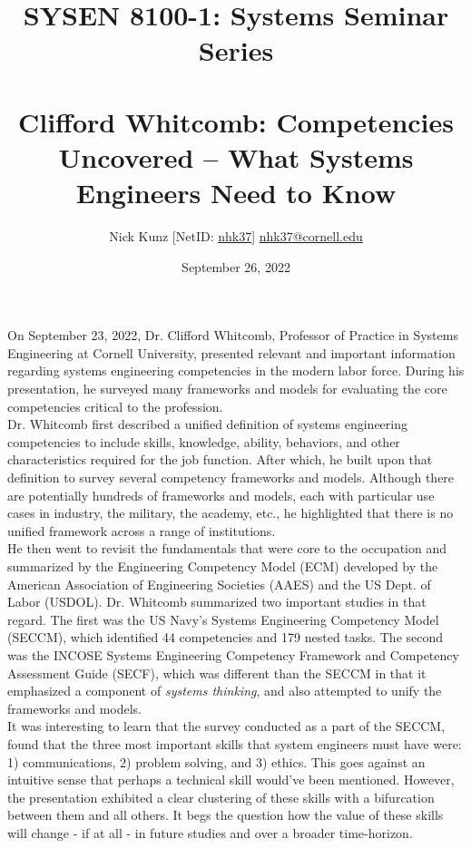 \documentclass[11pt]{article}
\begin{document}
\title{SYSEN 8100-1: Systems Seminar Series\\~\\
    \Large Clifford Whitcomb: Competencies Uncovered – What Systems Engineers Need to Know
}
\author{
    Nick Kunz [NetID: \url{nhk37}] \hyperlink{nhk37@cornell.edu}{nhk37@cornell.edu}
}
\date{September 26, 2022}
\maketitle

On September 23, 2022, Dr. Clifford Whitcomb, Professor of Practice in Systems Engineering at Cornell University, presented relevant and important information regarding systems engineering competencies in the modern labor force. During his presentation, he surveyed many frameworks and models for evaluating the core competencies critical to the profession.\\

Dr. Whitcomb first described a unified definition of systems engineering competencies to include skills, knowledge, ability, behaviors, and other characteristics required for the job function. After which, he built upon that definition to survey several competency frameworks and models. Although there are potentially hundreds of frameworks and models, each with particular use cases in industry, the military, the academy, etc., he highlighted that there is no unified framework across a range of institutions. \\

He then went to revisit the fundamentals that were core to the occupation and summarized by the Engineering Competency Model (ECM) developed by the American Association of Engineering Societies (AAES) and the US Dept. of Labor (USDOL). Dr. Whitcomb summarized two important studies in that regard. The first was the US Navy's Systems Engineering Competency Model (SECCM), which identified 44 competencies and 179 nested tasks. The second was the INCOSE Systems Engineering Competency Framework and Competency Assessment Guide (SECF), which was different than the SECCM in that it emphasized a component of \textit{systems thinking}, and also attempted to unify the frameworks and models. \\

It was interesting to learn that the survey conducted as a part of the SECCM, found that the three most important skills that system engineers must have were: 1) communications, 2) problem solving, and 3) ethics. This goes against an intuitive sense that perhaps a technical skill would've been mentioned. However, the presentation exhibited a clear clustering of these skills with a bifurcation between them and all others. It begs the question how the value of these skills will change - if at all - in future studies and over a broader time-horizon.
\end{document}
